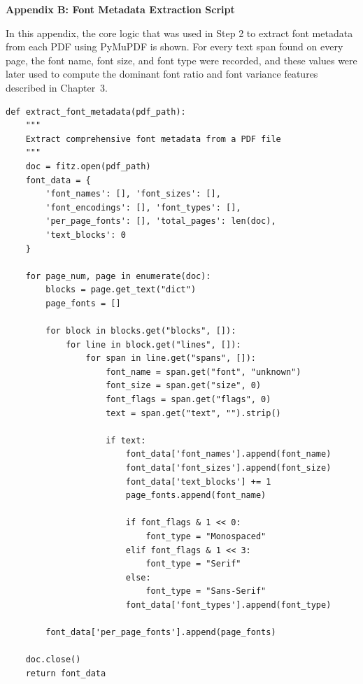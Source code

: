 \vspace{.2in}

\noindent
\textbf{Appendix B: Font Metadata Extraction Script}

\noindent
In this appendix, the core logic that was used in Step 2 to extract font metadata from each PDF using PyMuPDF is shown. For every text span found on every page, the font name, font size, and font type were recorded, and these values were later used to compute the dominant font ratio and font variance features described in Chapter~3.

\small
\begin{verbatim}
def extract_font_metadata(pdf_path):
    """
    Extract comprehensive font metadata from a PDF file
    """
    doc = fitz.open(pdf_path)
    font_data = {
        'font_names': [], 'font_sizes': [],
        'font_encodings': [], 'font_types': [],
        'per_page_fonts': [], 'total_pages': len(doc),
        'text_blocks': 0
    }

    for page_num, page in enumerate(doc):
        blocks = page.get_text("dict")
        page_fonts = []

        for block in blocks.get("blocks", []):
            for line in block.get("lines", []):
                for span in line.get("spans", []):
                    font_name = span.get("font", "unknown")
                    font_size = span.get("size", 0)
                    font_flags = span.get("flags", 0)
                    text = span.get("text", "").strip()

                    if text:
                        font_data['font_names'].append(font_name)
                        font_data['font_sizes'].append(font_size)
                        font_data['text_blocks'] += 1
                        page_fonts.append(font_name)

                        if font_flags & 1 << 0:
                            font_type = "Monospaced"
                        elif font_flags & 1 << 3:
                            font_type = "Serif"
                        else:
                            font_type = "Sans-Serif"
                        font_data['font_types'].append(font_type)

        font_data['per_page_fonts'].append(page_fonts)

    doc.close()
    return font_data
\end{verbatim}

\vspace{.2in}

